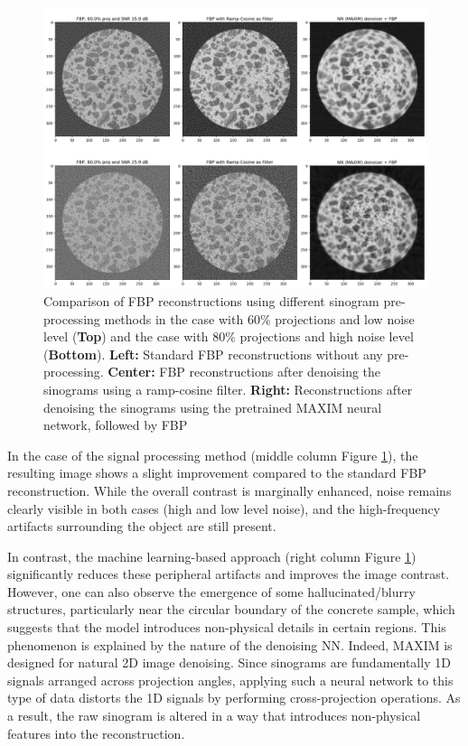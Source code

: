 \documentclass{article}
\begin{document}
\begin{figure}[H]
    \centering
    \includegraphics[scale=0.85]{figures/pre_pro.png}
    \caption{ Comparison of FBP reconstructions using different sinogram pre-processing methods in the case with 60\% projections and low noise level (\textbf{Top}) and the case with 80\% projections and high noise level (\textbf{Bottom}).
\textbf{Left:} Standard FBP reconstructions without any pre-processing.
\textbf{Center:} FBP reconstructions after denoising the sinograms using a ramp-cosine filter.
\textbf{Right:} Reconstructions after denoising the sinograms using the pretrained MAXIM neural network, followed by FBP}
    \label{fig:pre_pro}
\end{figure}
In the case of the signal processing method (middle column Figure \ref{fig:pre_pro}), the resulting image shows a slight improvement compared to the standard FBP reconstruction. While the overall contrast is marginally enhanced, noise remains clearly visible in both cases (high and low level noise), and the high-frequency artifacts surrounding the object are still present.
\medskip

In contrast, the machine learning-based approach (right column Figure \ref{fig:pre_pro}) significantly reduces these peripheral artifacts and improves the image contrast. However, one can also observe the emergence of some hallucinated/blurry structures, particularly near the circular boundary of the concrete sample, which suggests that the model introduces non-physical details in certain regions. This phenomenon is explained by the nature of the denoising NN. Indeed, MAXIM is designed for natural 2D image denoising. Since sinograms are fundamentally 1D signals arranged across projection angles, applying such a neural network to this type of data distorts the 1D signals by performing cross-projection operations. As a result, the raw sinogram is altered in a way that introduces non-physical features into the reconstruction. 
\end{document}
